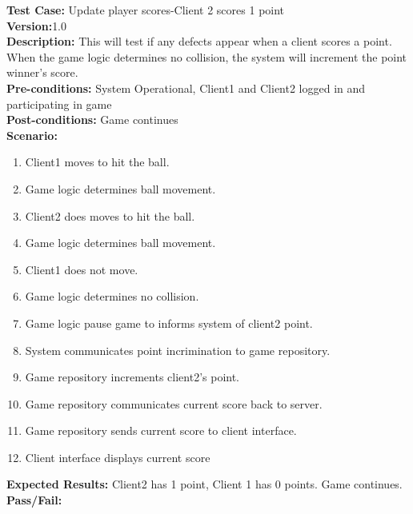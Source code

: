 \noindent \textbf{Test Case:} Update player scores-Client 2 scores 1 point\\
\textbf{Version:}1.0\\
\textbf{Description:} This will test if any defects appear when a client scores a point.  When the game logic determines no collision, the system will increment the point winner's score.\\
\textbf{Pre-conditions:} System Operational, Client1 and Client2 logged in and participating in game \\
\textbf{Post-conditions:} Game continues\\
\textbf{Scenario:}
\begin{enumerate}
\item Client1 moves to hit the ball.
\item Game logic determines ball movement.
\item Client2 does moves to hit the ball. 
\item Game logic determines ball movement.
\item Client1 does not move.
\item Game logic determines no collision. 
\item Game logic pause game to informs system of client2 point.
\item System communicates point incrimination to game repository.
\item Game repository increments client2’s point.
\item Game repository communicates current score back to server.
\item Game repository sends current score to client interface.
\item Client interface displays current score
\end{enumerate}
\textbf{Expected Results:} Client2 has 1 point, Client 1 has 0 points.  Game continues.\\
\textbf{Pass/Fail:}

